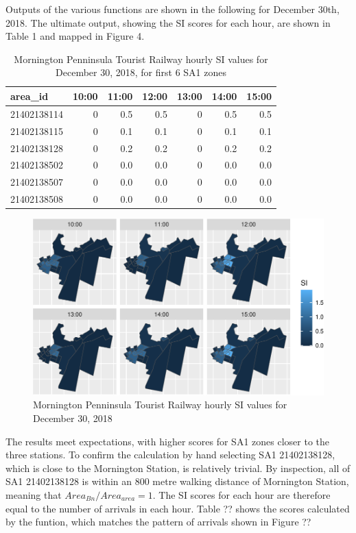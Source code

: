 \documentclass[preprint, 3p,
authoryear]{elsarticle} %
\begin{document}
Outputs of the various functions are shown in the following for December
30th, 2018. The ultimate output, showing the SI scores for each hour,
are shown in Table 1 and mapped in Figure 4.

\begin{table}

\caption{\label{tab:SI_mornington_20181230_output}Mornington Penninsula Tourist Railway hourly SI values for December 30, 2018, for first 6 SA1 zones}
\centering
\begin{tabular}[t]{l|r|r|r|r|r|r}
\hline
area\_id & 10:00 & 11:00 & 12:00 & 13:00 & 14:00 & 15:00\\
\hline
21402138114 & 0 & 0.5 & 0.5 & 0 & 0.5 & 0.5\\
\hline
21402138115 & 0 & 0.1 & 0.1 & 0 & 0.1 & 0.1\\
\hline
21402138128 & 0 & 0.2 & 0.2 & 0 & 0.2 & 0.2\\
\hline
21402138502 & 0 & 0.0 & 0.0 & 0 & 0.0 & 0.0\\
\hline
21402138507 & 0 & 0.0 & 0.0 & 0 & 0.0 & 0.0\\
\hline
21402138508 & 0 & 0.0 & 0.0 & 0 & 0.0 & 0.0\\
\hline
\end{tabular}
\end{table}

\begin{figure}
\centering
\includegraphics{Leveraging_GTFS_to_assess_transit_supply_Transport_Geography_files/figure-latex/SI_mornington_20181230_output-1.pdf}
\caption{Mornington Penninsula Tourist Railway hourly SI values for
December 30, 2018}
\end{figure}

The results meet expectations, with higher scores for SA1 zones closer
to the three stations. To confirm the calculation by hand selecting SA1
21402138128, which is close to the Mornington Station, is relatively
trivial. By inspection, all of SA1 21402138128 is within an 800 metre
walking distance of Mornington Station, meaning that
\(Area_{Bn} / Area_{area} = 1\). The SI scores for each hour are
therefore equal to the number of arrivals in each hour. Table ?? shows
the scores calculated by the funtion, which matches the pattern of
arrivals shown in Figure ??
\end{document}

